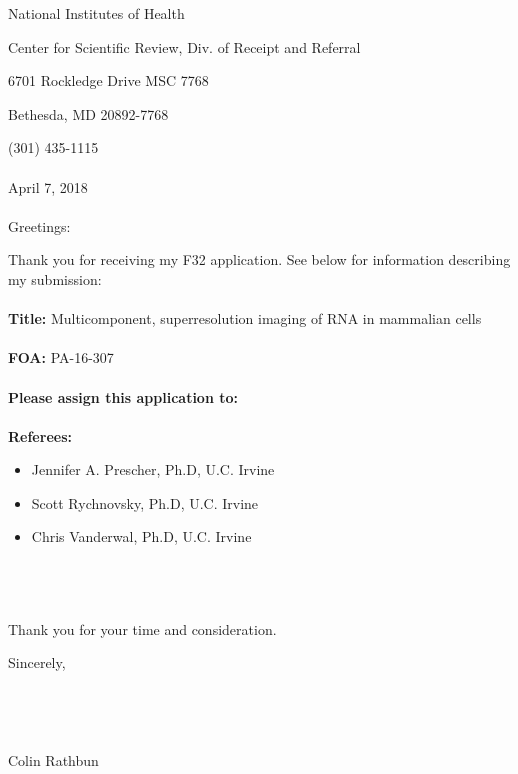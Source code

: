 
National Institutes of Health

Center for Scientific Review, Div. of Receipt and Referral

6701 Rockledge Drive MSC 7768

Bethesda, MD 20892-7768

(301) 435-1115
\\
\\
April 7, 2018
\\
\\
Greetings:

Thank you for receiving my F32 application. See below for information describing my submission:
\\
\\
\textbf{Title:} Multicomponent, superresolution imaging of RNA in mammalian cells
\\
\\
\textbf{FOA:} PA-16-307
\\
\\
\textbf{Please assign this application to:}
\\
\\
\textbf{Referees:}
\begin{itemize}
  \item Jennifer A. Prescher, Ph.D, U.C. Irvine
  \item Scott Rychnovsky, Ph.D, U.C. Irvine
  \item Chris Vanderwal, Ph.D, U.C. Irvine
\end{itemize}
\\
\\
\\
Thank you for your time and consideration.

Sincerely,
\\
\\
\\
\\
\\
Colin Rathbun

